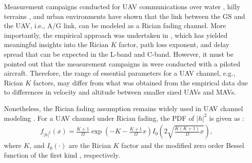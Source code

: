 Measurement campaigns conducted for UAV communications over water \cite{matolak2017air_water}, hilly terrains \cite{sun2017air_hilly}, and urban environments \cite{matolak2017air_suburban} have shown that the link between the GS and the UAV, i.e., A/G link, can be modeled as a Rician fading channel. More importantly, the empirical approach was undertaken in \cite{matolak2017air_water,sun2017air_hilly,matolak2017air_suburban}, which has yielded meaningful insights into the Rician $K$ factor, path loss exponent, and delay spread that can be expected in the L-band and C-band. However, it must be pointed out that the measurement campaigns in \cite{matolak2017air_water,sun2017air_hilly,matolak2017air_suburban} were conducted with a piloted aircraft. Therefore, the range of essential parameters for a UAV channel, e.g., Rician $K$ factors, may differ from what was obtained from the empirical data due to differences in velocity and altitude between smaller sized UAVs and MAVs. 

Nonetheless, the Rician fading assumption remains widely used in UAV channel modeling \cite{zeng2016wireless}. For a UAV channel under Rician fading, the PDF of $|h|^2$ is given as \cite[Table I]{rached2017unified}:
\begin{eqnarray} \label{lit_review_rician_pdf}
f_{|h|^2}(x) = \frac{K+1}{\Omega} \exp\left(-K-\frac{K+ 1}{\Omega}x\right)I_{0}\left(2\sqrt{\frac{K(K+1)}{\Omega}x}\right),
\end{eqnarray}
where $K$, and $I_{0}\left(\cdot\right)$ are the Rician $K$ factor and the modified zero order Bessel function of the first kind \cite{gradshteyn2014table}, respectively.

